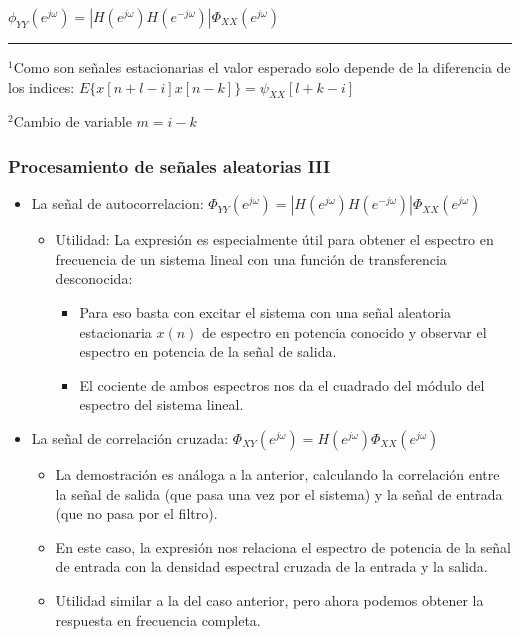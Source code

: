 \documentclass{beamer}
\numberwithin{section}{part}
\begin{document}
\begin{frame}
\begin{itemize}
{  
  
  $\phi_{YY}(e^{j\omega})=|H(e^{j\omega})H(e^{-j\omega})|\Phi_{XX}(e^{j\omega})$
  
  }
  
  \end{itemize}
  
  \vspace{-0.2cm}
  
  \rule{11cm}{0.04ex}
  
  \color{gray}
  \scriptsize
  $^1$Como son señales estacionarias el valor esperado solo depende de la diferencia de los indices: $E\{x[n\!+\!l\!-\!i]x[n\!-\!k]\}=\psi_{XX}[l+k-i]$
  
  $^2$Cambio de variable $m=i-k$
  
  
\end{frame}
  
  
\begin{frame}
  \frametitle{Procesamiento de señales aleatorias III}
  \vspace{-0.2cm}
  \footnotesize
  \begin{itemize}
    \item La señal de autocorrelacion: \alert{$\Phi_{YY}(e^{j\omega})=|H(e^{j\omega})H(e^{-j\omega})|\Phi_{XX}(e^{j\omega})$}
    \begin{itemize}
    \footnotesize
    \item Utilidad: La expresión es especialmente útil para obtener el espectro en frecuencia de un sistema lineal con una función de transferencia desconocida:  
    \begin{itemize}
      \footnotesize
      \item  Para eso basta con excitar el sistema con una señal aleatoria estacionaria $x(n)$ de espectro en potencia conocido y observar el espectro en potencia de la señal de salida.
      \item El cociente de ambos espectros nos da el cuadrado del módulo del espectro del sistema lineal.  
      \end{itemize}
    \end{itemize}  
    \item La señal de correlación cruzada: \alert{$\Phi_{XY}(e^{j\omega})=H(e^{j\omega})\Phi_{XX}(e^{j\omega})$}  
    \begin{itemize}
    \footnotesize
    \item La demostración es análoga a la anterior, calculando la correlación entre la señal de salida (que pasa una vez por el sistema) y la señal de entrada (que no pasa por el filtro). 
    \item En este caso, la expresión nos relaciona el espectro de potencia de la señal de entrada con la densidad espectral cruzada de la entrada y la salida. 
    \item Utilidad similar a la del caso anterior, pero ahora podemos obtener la respuesta en frecuencia completa.
    \end{itemize}
  \end{itemize}
\end{frame}
  
\end{document}
